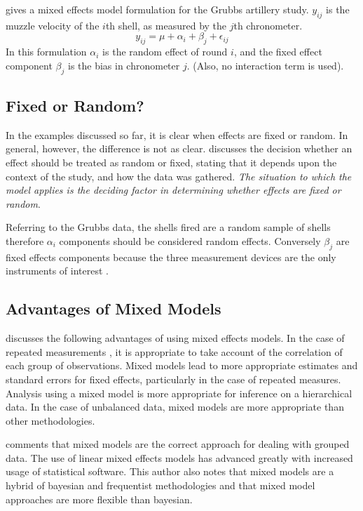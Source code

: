 \documentclass[12pt, a4paper]{report}
\theoremstyle{plain}
\theoremstyle{definition}
\theoremstyle{remark}
\begin{document}
\citet{Searle} gives a mixed effects model formulation for the
Grubbs artillery study. $y_{ij}$ is the muzzle velocity of the
$i$th shell, as measured by the $j$th chronometer.
\begin{equation}
y_{ij} = \mu + \alpha_{i} + \beta_{j}  + \epsilon_{ij}
\end{equation}
In this formulation $\alpha_{i}$ is the random effect of round
$i$, and the fixed effect component $\beta_{j}$ is the bias in
chronometer $j$. (Also, no interaction term is used).

\subsection{Fixed or Random?}

In the examples discussed so far, it is clear when effects are
fixed or random. In general, however, the difference is not as
clear. \citet{Searle} discusses the decision whether an effect
should be treated as random or fixed, stating that it depends upon
the context of the study, and how the data was gathered. \emph{The
	situation to which the model applies is the deciding factor in
	determining whether effects are fixed or random}.

Referring to the Grubbs data, the shells fired are a random sample
of shells therefore $\alpha_{i}$ components should be considered
random effects. Conversely $\beta_{j}$ are fixed effects
components because the three measurement devices are the only
instruments of interest \citep{Searle}.


\subsection{Advantages of Mixed Models}
\citet{BrownPrescott} discusses the  following advantages of using
mixed effects models. In the case of repeated measurements , it is
appropriate to take account of the correlation of each group of
observations. Mixed models lead to more appropriate estimates and
standard errors for fixed effects, particularly in the case of
repeated measures. Analysis using a mixed model is more
appropriate for inference on a hierarchical data. In the case of
unbalanced data, mixed models are more appropriate than other
methodologies.

\citet{Demi} comments that mixed models are the correct approach
for dealing with grouped data. The use of linear mixed effects
models has advanced greatly with increased usage of statistical
software. This author also notes that mixed models are a hybrid of
bayesian and frequentist methodologies and that mixed model
approaches are more flexible than bayesian.
\end{document}
